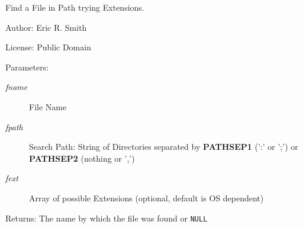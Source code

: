 Find a File in Path trying Extensions. 

\begin{Desc}
\item[Author:]Eric R. Smith \end{Desc}
\begin{Desc}
\item[License:]Public Domain\end{Desc}
\begin{Desc}
\item[Parameters:]
\begin{description}
\item[{\em fname}]File Name \item[{\em fpath}]Search Path: String of Directories separated by {\bf PATHSEP1} (':' or ';') or {\bf PATHSEP2} (nothing or ',') \item[{\em fext}]Array of possible Extensions (optional, default is OS dependent)\end{description}
\end{Desc}
\begin{Desc}
\item[Returns:]The name by which the file was found or {\tt NULL} \end{Desc}
